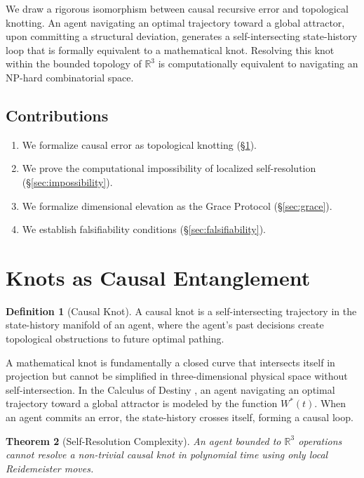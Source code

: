 \documentclass[12pt, a4paper]{article}
\theoremstyle{plain}
\newtheorem{theorem}{Theorem}[section]
\theoremstyle{definition}
\newtheorem{definition}[theorem]{Definition}
\theoremstyle{remark}
\begin{document}
We draw a rigorous isomorphism between causal recursive error and topological knotting. An agent navigating an optimal trajectory toward a global attractor, upon committing a structural deviation, generates a self-intersecting state-history loop that is formally equivalent to a mathematical knot. Resolving this knot within the bounded topology of $\mathbb{R}^3$ is computationally equivalent to navigating an NP-hard combinatorial space.

\subsection{Contributions}
\begin{enumerate}
    \item We formalize causal error as topological knotting (\S\ref{sec:knots}).
    \item We prove the computational impossibility of localized self-resolution (\S\ref{sec:impossibility}).
    \item We formalize dimensional elevation as the Grace Protocol (\S\ref{sec:grace}).
    \item We establish falsifiability conditions (\S\ref{sec:falsifiability}).
\end{enumerate}

\section{Knots as Causal Entanglement}\label{sec:knots}

\begin{definition}[Causal Knot]
A causal knot is a self-intersecting trajectory in the state-history manifold of an agent, where the agent's past decisions create topological obstructions to future optimal pathing.
\end{definition}

A mathematical knot is fundamentally a closed curve that intersects itself in projection but cannot be simplified in three-dimensional physical space without self-intersection. In the Calculus of Destiny \citep{DePaz2026Destiny}, an agent navigating an optimal trajectory toward a global attractor is modeled by the function $W^*(t)$. When an agent commits an error, the state-history crosses itself, forming a causal loop.

\begin{theorem}[Self-Resolution Complexity]
An agent bounded to $\mathbb{R}^3$ operations cannot resolve a non-trivial causal knot in polynomial time using only local Reidemeister moves.
\end{theorem}
\end{document}
